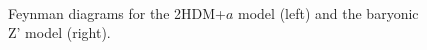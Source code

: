 \begin{figure}
\centering
 \hspace{1cm}
  \\
\caption{Feynman diagrams for the 2HDM+$a$ model (left) and the baryonic Z' model (right).}
\label{feyns}
\end{figure}





